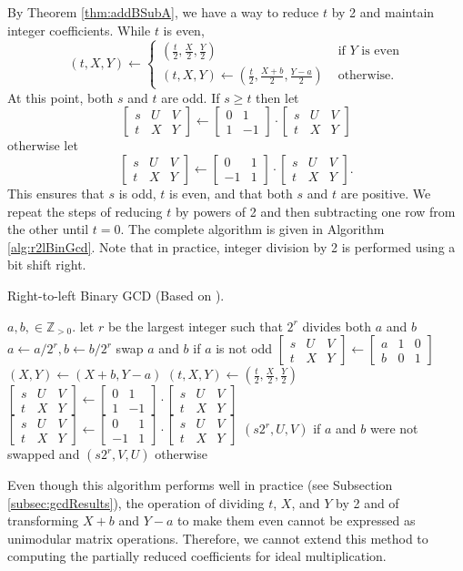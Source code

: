 \documentclass{ucalgthes1}
\theoremstyle{definition}
\newcommand{\ZZgtz}{\mathbb{Z}_{>0}}
\newcommand{\matrixtt}[4]{\left[ \begin{array}{rr} #1 & #2 \\ #3 & #4 \end{array} \right]}
\newcommand{\matrixThreeTwo}[6]{\left[ \begin{array}{rrr} #1 & #2 & #3 \\ #4 & #5 & #6 \end{array} \right]}
\begin{document}
By Theorem \ref{thm:addBSubA}, we have a way to reduce $t$ by 2 and maintain integer coefficients.  While $t$ is even, 
\[
	(t, X, Y) \gets \begin{cases}
		\left( \frac{t}{2}, \frac{X}{2}, \frac{Y}{2} \right) &
			\textrm{ if $Y$ is even} \\
		(t, X, Y) \gets \left( \frac{t}{2}, \frac{X+b}{2}, \frac{Y-a}{2} \right) & 
			\textrm{ otherwise.}
	\end{cases}
\]
At this point, both $s$ and $t$ are odd.  If $s \ge t$ then let
\[
	\matrixThreeTwo{s}{U}{V}{t}{X}{Y} \gets \matrixtt{0}{1}{1}{-1} \cdot \matrixThreeTwo{s}{U}{V}{t}{X}{Y}
\]
otherwise let
\[
	\matrixThreeTwo{s}{U}{V}{t}{X}{Y} \gets \matrixtt{0}{1}{-1}{1} \cdot \matrixThreeTwo{s}{U}{V}{t}{X}{Y}.
\]
This ensures that $s$ is odd, $t$ is even, and that both $s$ and $t$ are positive.  We repeat the steps of reducing $t$ by powers of 2 and then subtracting one row from the other until $t=0$.  The complete algorithm is given in Algorithm \ref{alg:r2lBinGcd}.  Note that in practice, integer division by 2 is performed using a bit shift right.

\begin{algorithm}[h]
\caption{Right-to-left Binary GCD (Based on \cite{Stein1967}).}
\label{alg:r2lBinGcd}
\begin{algorithmic}[1]
\REQUIRE $a,b, \in \ZZgtz$.
\STATE let $r$ be the largest integer such that $2^r$ divides both $a$ and $b$
\STATE $a \gets a / 2^r, b \gets b / 2^r$
\STATE swap $a$ and $b$ if $a$ is not odd
\STATE $\matrixThreeTwo{s}{U}{V}{t}{X}{Y} \gets \matrixThreeTwo{a}{1}{0}{b}{0}{1}$
			\STATE $(X, Y) \gets (X+b, Y-a)$
		\ENDIF
		\STATE $(t, X, Y) \gets \left( \frac{t}{2}, \frac{X}{2}, \frac{Y}{2} \right)$
	\ENDWHILE
		\STATE $\matrixThreeTwo{s}{U}{V}{t}{X}{Y} \gets \matrixtt{0}{1}{1}{-1} \cdot \matrixThreeTwo{s}{U}{V}{t}{X}{Y}$
	\ELSE
		\STATE $\matrixThreeTwo{s}{U}{V}{t}{X}{Y} \gets \matrixtt{0}{1}{-1}{1} \cdot \matrixThreeTwo{s}{U}{V}{t}{X}{Y}$
	\ENDIF
\ENDWHILE
\RETURN $(s2^r, U, V)$ if $a$ and $b$ were not swapped and $(s2^r, V, U)$ otherwise
\end{algorithmic}
\end{algorithm}

Even though this algorithm performs well in practice (see Subsection \ref{subsec:gcdResults}), the operation of dividing $t$, $X$, and $Y$ by 2 and of transforming $X+b$ and $Y-a$ to make them even cannot be expressed as unimodular matrix operations.  Therefore, we cannot extend this method to computing the partially reduced coefficients for ideal multiplication.
\end{document}
